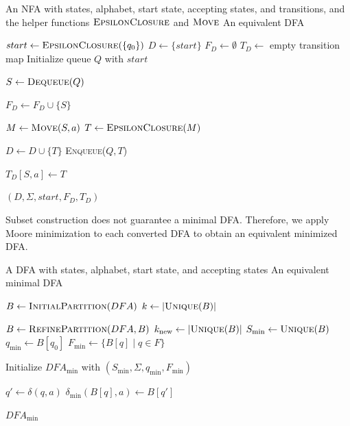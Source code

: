 \documentclass[9pt]{ieeeconf}
\begin{document}
\begin{algorithm}[t]
\caption{NFA-to-DFA Conversion Using Subset Construction}
\label{alg:subset}
\begin{algorithmic}[1]
\Require An NFA with states, alphabet, start state,
accepting states, and transitions,
and the helper functions $\textsc{EpsilonClosure}$ and $\textsc{Move}$
\Ensure An equivalent DFA

\State $start \gets \textsc{EpsilonClosure}(\{q_0\})$
\State $D \gets \{start\}$
\State $F_D \gets \emptyset$
\State $T_D \gets$ empty transition map
\State Initialize queue $Q$ with $start$

    \State $S \gets \textsc{Dequeue}(Q)$

        \State $F_D \gets F_D \cup \{S\}$
    \EndIf

        \State $M \gets \textsc{Move}(S,a)$
        \State $T \gets \textsc{EpsilonClosure}(M)$

            \State $D \gets D \cup \{T\}$
            \State \textsc{Enqueue}($Q,T$)
        \EndIf

        \State $T_D[S,a] \gets T$
    \EndFor
\EndWhile

\State \Return $(D,\Sigma,start,F_D,T_D)$
\end{algorithmic}
\end{algorithm}

Subset construction does not guarantee a minimal DFA. Therefore, we apply Moore minimization to each converted DFA to obtain an equivalent minimized DFA.

\begin{algorithm}[t]
\caption{DFA Minimization Using Moore's Algorithm}
\label{alg:moore}
\begin{algorithmic}[1]
\Require A DFA with states, alphabet, start state, and accepting states
\Ensure An equivalent minimal DFA

\State $B \gets \textsc{InitialPartition}(DFA)$
\State $k \gets |\textsc{Unique}(B)|$

\Repeat
    \State $B \gets \textsc{RefinePartition}(DFA,B)$
    \State $k_{\text{new}} \gets |\textsc{Unique}(B)|$
\State $S_{\min} \gets \textsc{Unique}(B)$
\State $q_{\min} \gets B[q_0]$
\State $F_{\min} \gets \{B[q] \mid q \in F\}$

\State Initialize $DFA_{\min}$ with
$(S_{\min},\Sigma,q_{\min},F_{\min})$

        \State $q' \gets \delta(q,a)$
        \State $\delta_{\min}(B[q],a) \gets B[q']$
    \EndFor
\EndFor

\State \Return $DFA_{\min}$
\end{algorithmic}
\end{algorithm}
\end{document}
